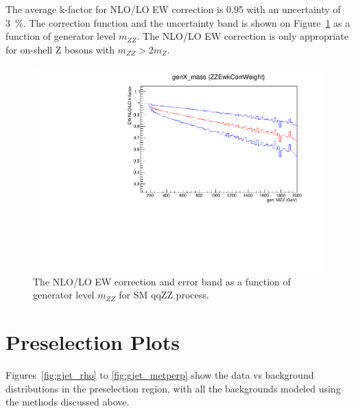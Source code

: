 \vspace{0.3cm}
The average k-factor for NLO/LO EW correction is 0.95 with an uncertainty of 3~\%. 
The correction function and the uncertainty band is shown on Figure~\ref{fig:qqzz_nlo_ew}
as a function of generator level $m_{ZZ}$. 
The NLO/LO EW correction is only appropriate for on-shell Z bosons with $m_{ZZ}>2 m_{Z}$. 

\begin{figure}[htbp!]
\centering
  \includegraphics[width=0.48\linewidth]{figures/ewkfactor.pdf}
  \caption{The NLO/LO EW correction and error band as a function of generator level $m_{ZZ}$ for SM qqZZ process.}
  \label{fig:qqzz_nlo_ew}
\end{figure}

\clearpage
\section{Preselection Plots}
Figures~\ref{fig:gjet_rho} to \ref{fig:gjet_metperp} show the data vs background distributions in the preselection region, with all the backgrounds modeled using the methods discussed above. 

